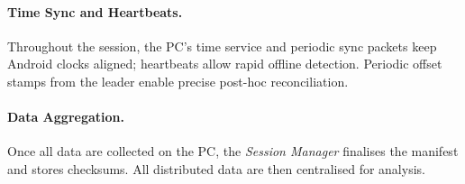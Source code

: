 \documentclass{report}
\begin{document}
    \paragraph{Time Sync and Heartbeats.} Throughout the session, the PC’s time service and periodic sync packets keep Android clocks aligned; heartbeats allow rapid offline detection. Periodic offset stamps from the leader enable precise post-hoc reconciliation.

    \paragraph{Data Aggregation.} Once all data are collected on the PC, the \textit{Session Manager} finalises the manifest and stores checksums. All distributed data are then centralised for analysis.
\end{document}
